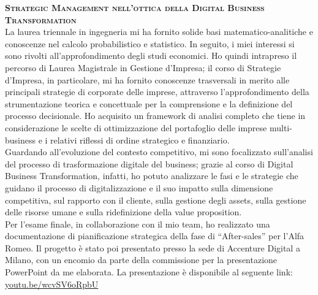 \newpage
{}  %
\hypersetup{
    linkcolor=cvblue,        %
    urlcolor=cvblue         %
}
\setlength{\parskip}{0.8ex}




\textbf{\textsc{Strategic Management nell’ottica della Digital Business Transformation}} \\
La laurea triennale in ingegneria mi ha fornito solide basi matematico-analitiche e conoscenze nel calcolo probabilistico e statistico. In seguito, i miei interessi si sono rivolti all’approfondimento degli studi economici. Ho quindi intrapreso il percorso di Laurea Magistrale in Gestione d’Impresa; il corso di Strategie d’Impresa, in particolare, mi ha fornito conoscenze trasversali in merito alle principali strategie di corporate delle imprese, attraverso l’approfondimento della strumentazione teorica e concettuale per la comprensione e la definizione del processo decisionale. Ho acquisito un framework di analisi completo che tiene in considerazione le scelte di ottimizzazione del portafoglio delle imprese multi-business e i relativi riflessi di ordine strategico e finanziario. \\
Guardando all’evoluzione del contesto competitivo, mi sono focalizzato sull’analisi del processo di trasformazione digitale del business; grazie al corso di Digital Business Transformation, infatti, ho potuto analizzare le fasi e le strategie che guidano il processo di digitalizzazione e il suo impatto sulla dimensione competitiva, sul rapporto con il cliente, sulla gestione degli assets, sulla gestione delle risorse umane e sulla ridefinizione della value proposition. \\
Per l’esame finale, in collaborazione con il mio team, ho realizzato una documentazione di pianificazione strategica della fase di “After-sales” per l’Alfa Romeo. Il progetto è stato poi presentato presso la sede di Accenture Digital a Milano, con un encomio da parte della commissione per la presentazione PowerPoint da me elaborata.
La presentazione è disponibile al seguente link: \\
\href{https://youtu.be/wcvSV6oRpbU}{youtu.be/wcvSV6oRpbU}

